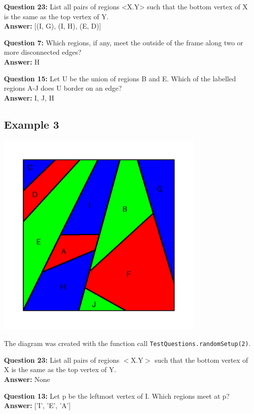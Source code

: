 \documentclass{article}    %
\begin{document}
{\bf Question  23:} List all pairs of regions <X.Y> such that the bottom vertex of X is the same as the top vertex of Y. \\
{\bf Answer:}  [(I, G), (I, H), (E, D)]

{\bf Question  7:} Which regions, if any, meet the outside of the frame along two or more disconnected edges? \\
{\bf Answer:}  {H}

{\bf Question  15:} Let U be the union of regions B and E. Which of the labelled regions A-J does U border on an edge? \\
{\bf Answer:}  {I, J, H}

\pagebreak

\subsection{Example 3}
\begin{center}
\includegraphics[height=4in]{Maps/RandomSetup2.png}
\end{center}

{\small  The diagram was created with the function 
call  {\tt TestQuestions.randomSetup(2)}.}


{\bf Question  23:} List all pairs of regions $<$X.Y$>$ such that the bottom vertex of X is the same as the top vertex of Y. \\
{\bf Answer:}  None

{\bf Question  13:} Let p be the leftmost vertex of I. Which regions meet at p? \\
{\bf Answer:}  ['I', 'E', 'A']
\end{document}
